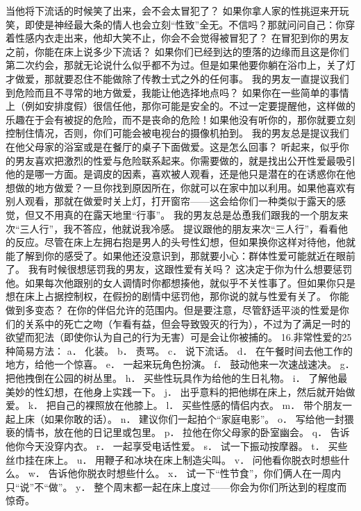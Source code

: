 \documentclass[12pt,UTF8,openany]{ctexbook}
\begin{document}
当他将下流话的时候笑了出来，会不会太冒犯了？
如果你拿人家的性挑逗来开玩笑，即使是神经最大条的情人也会立刻“性致”全无。不信吗？那就问问自己：你穿着性感内衣走出来，他却大笑不止，你会不会觉得被冒犯了？
在冒犯到你的男友之前，你能在床上说多少下流话？
如果你们已经到达的堕落的边缘而且这是你们第二次约会，那就无论说什么似乎都不为过。但是如果他要你躺在浴巾上，关了灯才做爱，那就要忍住不能做除了传教士式之外的任何事。
我的男友一直提议我们到危险而且不寻常的地方做爱，我能让他选择地点吗？
如果你在一些简单的事情上（例如安排度假）很信任他，那你可能是安全的。不过一定要提醒他，这样做的乐趣在于会有被捉的危险，而不是丧命的危险！如果他没有听你的，那你就要立刻控制住情况，否则，你们可能会被电视台的摄像机拍到。
我的男友总是提议我们在他父母家的浴室或是在餐厅的桌子下面做爱。这是怎么回事？
听起来，似乎你的男友喜欢把激烈的性爱与危险联系起来。你需要做的，就是找出公开性爱最吸引他的是哪一方面。是调皮的因素，喜欢被人观看，还是他只是潜在的在诱惑你在他想做的地方做爱？一旦你找到原因所在，你就可以在家中加以利用。如果他喜欢有别人观看，那就在做爱时关上灯，打开窗帘——这会给你们一种类似于露天的感觉，但又不用真的在露天地里“行事”。
我的男友总是怂恿我们跟我的一个朋友来次“三人行”，我不答应，他就说我冷感。
提议跟他的朋友来次“三人行”，看看他的反应。尽管在床上左拥右抱是男人的头号性幻想，但如果换你这样对待他，他就能了解到你的感受了。如果他还没意识到，那就要小心：群体性爱可能就近在眼前了。
我有时候很想惩罚我的男友，这跟性爱有关吗？
这决定于你为什么想要惩罚他。如果每次他跟别的女人调情时你都想揍他，就似乎不关性事了。但如果你只是想在床上占据控制权，在假扮的剧情中惩罚他，那你说的就与性爱有关了。
你能做到多变态？
在你的伴侣允许的范围内。但是要注意，尽管舒适平淡的性爱是你们的关系中的死亡之吻（乍看有益，但会导致毁灭的行为），不过为了满足一时的欲望而犯法（即使你认为自己的行为无害）可是会让你被捕的。
16.非常性爱的25种简易方法：
a． 化装。
b． 责骂。
c． 说下流话。
d． 在午餐时间去他工作的地方，给他一个惊喜。
e． 一起来玩角色扮演。
f． 鼓动他来一次速战速决。
g． 把他拽倒在公园的树丛里。
h． 买些性玩具作为给他的生日礼物。
i． 了解他最美妙的性幻想，在他身上实践一下。
j． 出乎意料的把他绑在床上，然后就开始做爱。
k． 把自己的裸照放在他膝上。
l． 买些性感的情侣内衣。
m． 带个朋友一起上床（如果你敢的话）。
n． 建议你们一起拍个“家庭电影”。
o． 写给他一封猥亵的情书，放在他的日记里或包里。
p． 拉他在你父母家的卧室幽会。
q． 告诉他你今天没穿内衣。
r． 一起享受电话性爱。
s． 试一下振动按摩器。
t． 买些丝巾挂在床上。
u． 用鞭子和冰块在床上制造尖叫。
v． 问他看你脱衣时想些什么。
w． 告诉他你脱衣时想些什么。
x． 试一下“性节食”，你们俩人在一周内只“说”不“做”。
y． 整个周末都一起在床上度过——你会为你们所达到的程度而惊奇。
\end{document}
